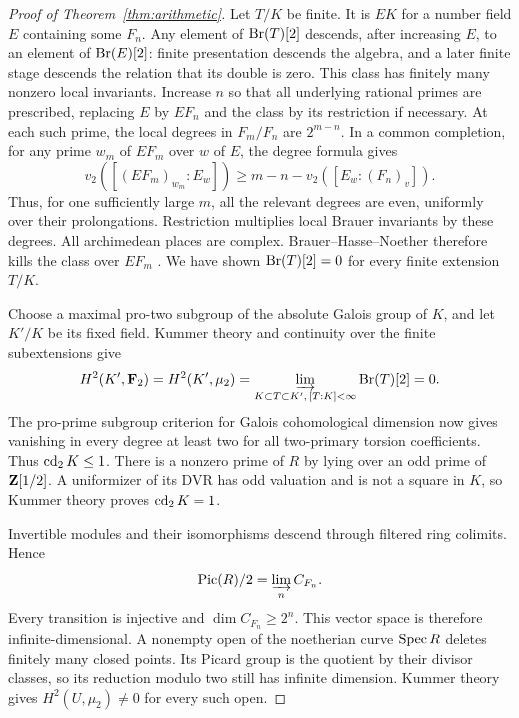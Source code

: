 \begin{proof}[Proof of Theorem~\ref{thm:arithmetic}]
Let $T/K$ be finite. It is $EK$ for a number field $E$ containing
some $F_n$. Any element of $\operatorname{Br}(T)[2]$ descends, after increasing
$E$, to an element of $\operatorname{Br}(E)[2]$: finite presentation descends
the algebra, and a later finite stage descends the relation that
its double is zero. This class has finitely many nonzero local
invariants. Increase $n$ so that all underlying rational primes
are prescribed, replacing $E$ by $EF_n$ and the class by its
restriction if necessary. At each such prime, the local degrees in
$F_m/F_n$ are $2^{m-n}$. In a common completion, for any prime
$w_m$ of $EF_m$ over $w$ of $E$, the degree formula gives
\[
 v_2([(EF_m)_{w_m}:E_w])
 \ge m-n-v_2([E_w:(F_n)_v]).
\]
Thus, for one sufficiently large $m$, all the relevant degrees
are even, uniformly over their prolongations. Restriction multiplies
local Brauer invariants by these degrees. All archimedean places
are complex. Brauer--Hasse--Noether therefore kills the class over
$EF_m$ \cite[Chapter III, Theorem 2.1, p.~103, and Chapter VIII,
Theorem 4.2, p.~241]{MilneCFT}.
We have shown $\operatorname{Br}(T)[2]=0$ for every finite extension $T/K$.

Choose a maximal pro-two subgroup of the absolute Galois group of
$K$, and let $K'/K$ be its fixed field. Kummer theory and continuity
over the finite subextensions give
\[
 H^2(K',\mathbf F_2)=H^2(K',\mu_2)
 =\varinjlim_{K\subset T\subset K',\,[T:K]<\infty}\operatorname{Br}(T)[2]=0.
\]
The pro-prime subgroup criterion for Galois cohomological dimension
\cite[Tag 0DV9, Lemma 59.67.3]{Stacks} now gives vanishing in
every degree at least two for all two-primary torsion coefficients.
Thus $\operatorname{cd}_2K\le1$. There is a nonzero prime of $R$
by lying over an odd prime of $\mathbf Z[1/2]$. A uniformizer of its
DVR has odd valuation and is not a square in $K$, so Kummer
theory proves $\operatorname{cd}_2K=1$.

Invertible modules and their isomorphisms descend through filtered
ring colimits. Hence
\[
 \operatorname{Pic}(R)/2=\varinjlim_n C_{F_n}.
\]
Every transition is injective and $\dim C_{F_n}\ge2^n$.
This vector space is therefore infinite-dimensional. A nonempty
open of the noetherian curve $\operatorname{Spec} R$ deletes finitely many
closed points. Its Picard group is the quotient by their divisor
classes, so its reduction modulo two still has infinite dimension.
Kummer theory gives $H^2(U,\mu_2)\ne0$ for every such open.


\end{proof}
